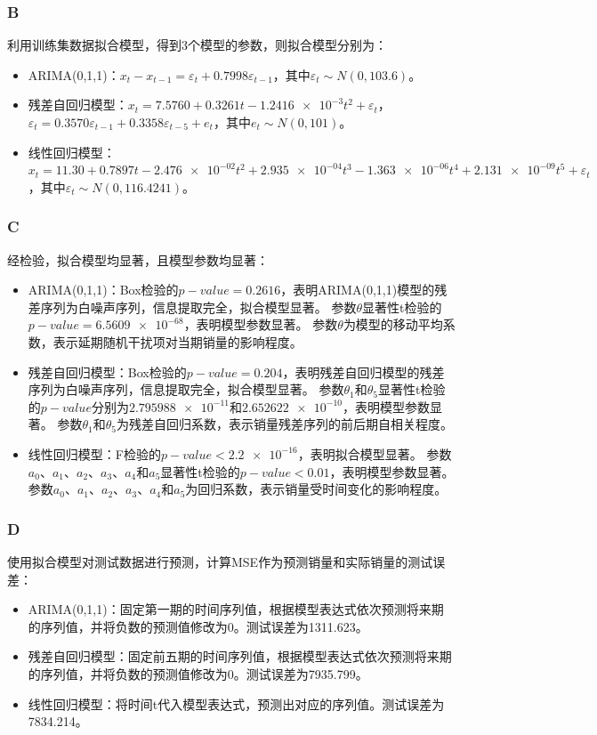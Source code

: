 \documentclass[12pt,a4paper]{article}
\begin{document}
    \subsubsection*{B}
    利用训练集数据拟合模型，得到3个模型的参数，则拟合模型分别为：
    \begin{itemize}
        \item ARIMA(0,1,1)：$x_t-x_{t-1}=\varepsilon_t+0.7998\varepsilon_{t-1}$，其中$\varepsilon_t\sim N(0,103.6)$。
        \item 残差自回归模型：$x_t=7.5760+0.3261t-\num{1.2416e-3}t^2+\varepsilon_t$，$\varepsilon_t=0.3570\varepsilon_{t-1}+0.3358\varepsilon_{t-5}+e_t$，其中$e_t\sim N(0,101)$。
        \item 线性回归模型：$x_t=11.30+0.7897t-\num{2.476e-02}t^2+\num{2.935e-04}t^3-\num{1.363e-06}t^4+\num{2.131e-09}t^5+\varepsilon_t$，其中$\varepsilon_t\sim N(0,116.4241)$。
    \end{itemize}
    \subsubsection*{C}
    经检验，拟合模型均显著，且模型参数均显著：
    \begin{itemize}
        \item ARIMA(0,1,1)：Box检验的$p-value=0.2616$，表明ARIMA(0,1,1)模型的残差序列为白噪声序列，信息提取完全，拟合模型显著。
        参数$\theta$显著性t检验的$p-value=\num{6.5609e-68}$，表明模型参数显著。
        参数$\theta$为模型的移动平均系数，表示延期随机干扰项对当期销量的影响程度。
        \item 残差自回归模型：Box检验的$p-value=0.204$，表明残差自回归模型的残差序列为白噪声序列，信息提取完全，拟合模型显著。
        参数$\theta_1$和$\theta_5$显著性t检验的$p-value$分别为$\num{2.795988e-11}$和$\num{2.652622e-10}$，表明模型参数显著。
        参数$\theta_1$和$\theta_5$为残差自回归系数，表示销量残差序列的前后期自相关程度。
        \item 线性回归模型：F检验的$p-value<\num{2.2e-16}$，表明拟合模型显著。
        参数$a_0$、$a_1$、$a_2$、$a_3$、$a_4$和$a_5$显著性t检验的$p-value<0.01$，表明模型参数显著。
        参数$a_0$、$a_1$、$a_2$、$a_3$、$a_4$和$a_5$为回归系数，表示销量受时间变化的影响程度。
    \end{itemize}
    \subsubsection*{D}
    使用拟合模型对测试数据进行预测，计算MSE作为预测销量和实际销量的测试误差：
    \begin{itemize}
        \item ARIMA(0,1,1)：固定第一期的时间序列值，根据模型表达式依次预测将来期的序列值，并将负数的预测值修改为0。测试误差为1311.623。
        \item 残差自回归模型：固定前五期的时间序列值，根据模型表达式依次预测将来期的序列值，并将负数的预测值修改为0。测试误差为7935.799。
        \item 线性回归模型：将时间t代入模型表达式，预测出对应的序列值。测试误差为7834.214。
    \end{itemize}
\end{document}
